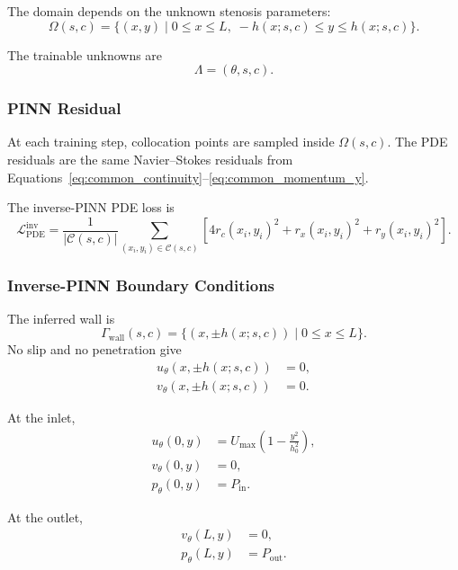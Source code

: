 \documentclass[11pt]{article}
\begin{document}
The domain depends on the unknown stenosis parameters:
\begin{equation}
    \Omega(s,c)
    =
    \{(x,y)\mid 0\le x\le L,\; -h(x;s,c)\le y\le h(x;s,c)\}.
\end{equation}

The trainable unknowns are
\begin{equation}
    \Lambda=(\theta,s,c).
\end{equation}

\subsubsection{PINN Residual}

At each training step, collocation points are sampled inside $\Omega(s,c)$. The PDE residuals are the same Navier--Stokes residuals from Equations~\eqref{eq:common_continuity}--\eqref{eq:common_momentum_y}.

The inverse-PINN PDE loss is
\begin{equation}
    \mathcal{L}_{\mathrm{PDE}}^{\mathrm{inv}}
    =
    \frac{1}{|\mathcal{C}(s,c)|}
    \sum_{(x_i,y_i)\in\mathcal{C}(s,c)}
    \left[
        4r_c(x_i,y_i)^2
        +
        r_x(x_i,y_i)^2
        +
        r_y(x_i,y_i)^2
    \right].
\end{equation}

\subsubsection{Inverse-PINN Boundary Conditions}

The inferred wall is
\begin{equation}
    \Gamma_{\mathrm{wall}}(s,c)
    =
    \{(x,\pm h(x;s,c))\mid 0\le x\le L\}.
\end{equation}
No slip and no penetration give
\begin{align}
    u_{\theta}(x,\pm h(x;s,c))&=0,\\
    v_{\theta}(x,\pm h(x;s,c))&=0.
\end{align}

At the inlet,
\begin{align}
    u_{\theta}(0,y)
    &=
    U_{\max}
    \left(
        1-\frac{y^2}{h_0^2}
    \right),\\
    v_{\theta}(0,y)&=0,\\
    p_{\theta}(0,y)&=P_{\mathrm{in}}.
\end{align}

At the outlet,
\begin{align}
    v_{\theta}(L,y)&=0,\\
    p_{\theta}(L,y)&=P_{\mathrm{out}}.
\end{align}
\end{document}
